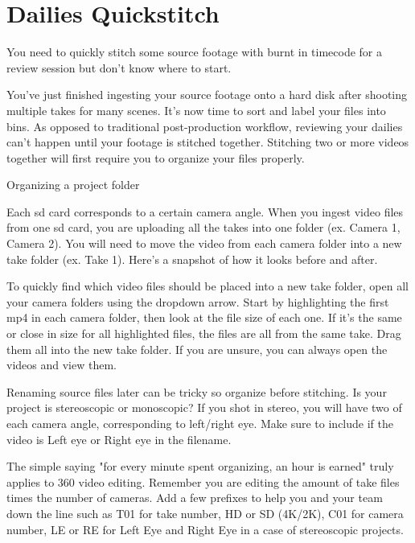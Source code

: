 \chapter{Dailies Quickstitch}
\pagecolor{white}
\label{chap:30}
\begin{fullwidth}

\problem

{\large You need to quickly stitch some source footage with burnt in timecode for a review session but don't know where to start. \par}

You've just finished ingesting your source footage onto a hard disk after shooting multiple takes for many scenes. It's now time to sort and label your files into bins. As opposed to traditional post-production workflow, reviewing your dailies can't happen until your footage is stitched together. Stitching two or more videos together will first require you to organize your files properly.

\solution

{\large Organizing a project folder \par}

Each sd card corresponds to a certain camera angle. When you ingest video files from one sd card, you are uploading all the takes into one folder (ex. Camera 1, Camera 2). You will need to move the video from each camera folder into a new take folder (ex. Take 1). Here's a snapshot of how it looks before and after.


To quickly find which video files should be placed into a new take folder, open all your camera folders using the dropdown arrow. Start by highlighting the first mp4 in each camera folder, then look at the file size of each one. If it's the same or close in size for all highlighted files, the files are all from the same take. Drag them all into the new take folder. If you are unsure, you can always open the videos and view them.

Renaming source files later can be tricky so organize before stitching. Is your project is stereoscopic or monoscopic? If you shot in stereo, you will have two of each camera angle, corresponding to left/right eye. Make sure to include if the video is Left eye or Right eye in the filename.

The simple saying "for every minute spent organizing, an hour is earned" truly applies to 360 video editing. Remember you are editing the amount of take files times the number of cameras. Add a few prefixes to help you and your team down the line such as T01 for take number, HD or SD (4K/2K), C01 for camera number, LE or RE for Left Eye and Right Eye in a case of stereoscopic projects.


\end{fullwidth}
